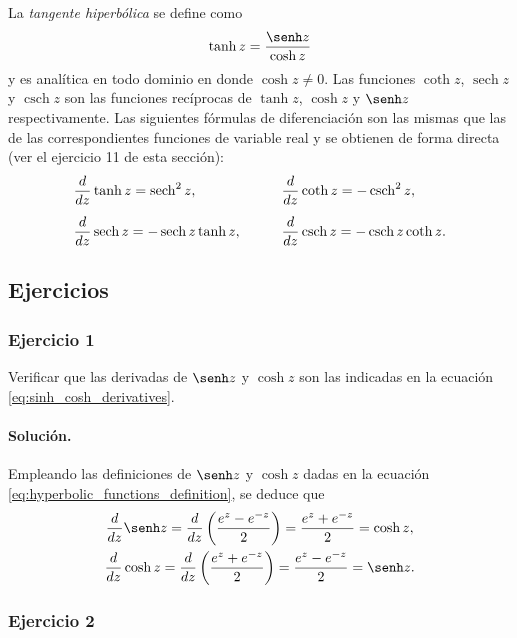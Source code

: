\documentclass[a4paper]{report}
\DeclareMathOperator{\sech}{sech}
\DeclareMathOperator{\csch}{csch}
\begin{document}
La \emph{tangente hiperbólica} se define como
\begin{equation}\label{eq:hyperbolic_functions_tanh_definition}
 \tanh z=\frac{\senh z}{\cosh z} 
\end{equation}
y es analítica en todo dominio en donde \(\cosh z\neq0\). Las funciones \(\coth z\), \(\sech z\) y \(\csch z\) son las funciones recíprocas de \(\tanh z\), \(\cosh z\) y \(\senh z\) respectivamente. Las siguientes fórmulas de diferenciación son las mismas que las de las correspondientes funciones de variable real y se obtienen de forma directa (ver el ejercicio 11 de esta sección):
\begin{equation}\label{eq:hyperbolic_functions_reciprocal_derivatives}
 \begin{array}{ll}
  \dfrac{d}{dz}\tanh z=\sech^2z, &\qquad\dfrac{d}{dz}\coth z=-\csch^2z,\\[\bigskipamount]
  \dfrac{d}{dz}\sech z=-\sech z\tanh z, &\qquad\dfrac{d}{dz}\csch z=-\csch z\coth z. 
 \end{array} 
\end{equation}

\subsection*{Ejercicios}

\subsubsection{Ejercicio 1}

Verificar que las derivadas de \(\senh z\) y \(\cosh z\) son las indicadas en la ecuación \ref{eq:sinh_cosh_derivatives}.

\paragraph{Solución.} Empleando las definiciones de \(\senh z\) y \(\cosh z\) dadas en la ecuación \ref{eq:hyperbolic_functions_definition}, se deduce que 
\begin{gather*}
 \frac{d}{dz}\senh z=\frac{d}{dz}\left(\frac{e^z-e^{-z}}{2}\right)=\frac{e^z+e^{-z}}{2}=\cosh z,\\
 \frac{d}{dz}\cosh z=\frac{d}{dz}\left(\frac{e^z+e^{-z}}{2}\right)=\frac{e^z-e^{-z}}{2}=\senh z.
\end{gather*}

\subsubsection{Ejercicio 2}
\end{document}
